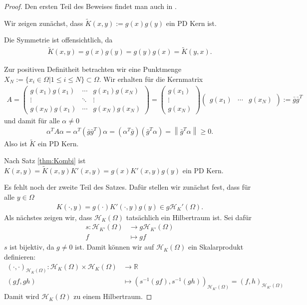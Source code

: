 \begin{proof}
Den ersten Teil des Beweises findet man auch in \textcite[Proposition 2.7]{Santin.2017}.

Wir zeigen zunächst, dass $\tilde{K}(x,y):= g(x)g(y)$ ein \ac{PD} Kern ist.

Die Symmetrie ist offensichtlich, da
\begin{align*}
\tilde{K}(x,y)= g(x)g(y) = g(y) g(x) = \tilde{K}(y,x).
\end{align*}

Zur positiven Definitheit betrachten wir eine Punktmenge $X_N := \{x_i \in \Omega| 1 \le i \le N \}\subset \Omega$. Wir erhalten für die Kernmatrix
\begin{align*}
A = 
\begin{pmatrix}
g(x_1)g(x_1) & \cdots & g(x_1)g(x_N) \\ 
\vdots & \ddots & \vdots \\ 
g(x_N)g(x_1) & \cdots & g(x_N)g(x_N)
\end{pmatrix} 
=
\begin{pmatrix}
g(x_1) \\ 
\vdots \\ 
g(x_N)
\end{pmatrix}
\begin{pmatrix}
g(x_1) & \cdots & g(x_N)
\end{pmatrix}
:= \bar{g}\bar{g}^T
\end{align*}
und damit für alle $\alpha \neq 0$
\begin{align*}
\alpha^T A \alpha = \alpha^T \left(\bar{g}\bar{g}^T\right)\alpha = \left(\alpha^T \bar{g}\right)\left(\bar{g}^T \alpha\right) = \left\| \bar{g}^T\alpha\right\| \geq 0.
\end{align*}
Also ist $\tilde{K}$ ein \ac{PD} Kern.

Nach Satz \ref{thm:Kombi} ist $K(x,y) = \tilde{K}(x,y) K'(x,y) = g(x) K'(x,y) g(y)$ ein \ac{PD} Kern.

Es fehlt noch der zweite Teil des Satzes. Dafür stellen wir zunächst fest, dass für alle $y \in \Omega$
\begin{align*}
K(\cdot,y) = g(\cdot) K'(\cdot,y) g(y) \in g \mathcal{H}_K' (\Omega).
\end{align*}
Als nächstes zeigen wir, dass $\mathcal{H}_K(\Omega)$ tatsächlich ein Hilbertraum ist. Sei dafür
\begin{align*}
s : \mathcal{H}_{K'} (\Omega) &\rightarrow g\mathcal{H}_{K'} (\Omega)\\
f &\mapsto gf
\end{align*}
$s$ ist bijektiv, da $g \neq 0$ ist. Damit können wir auf $\mathcal{H}_K (\Omega)$ ein Skalarprodukt definieren:
\begin{align*}
\left(\cdot, \cdot \right)_{\mathcal{H}_K(\Omega)} : \mathcal{H}_K(\Omega) \times \mathcal{H}_K(\Omega) &\rightarrow \mathbb{R}\\
(gf, gh) &\mapsto \left(s^{-1}(gf), s^{-1}(gh)\right)_{\mathcal{H}_{K'}(\Omega)} = \left( f,h \right)_{\mathcal{H}_{K'}(\Omega)}
\end{align*}
Damit wird $\mathcal{H}_K(\Omega)$ zu einem Hilbertraum. 


\end{proof}
